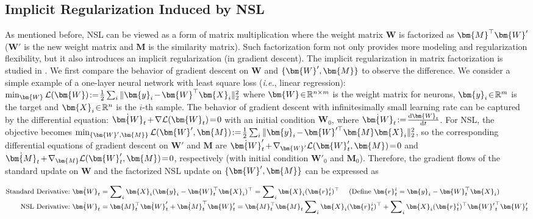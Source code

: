 \subsection{Implicit Regularization Induced by NSL}

As mentioned before, NSL can be viewed as a form of matrix multiplication where the weight matrix $\bm{W}$ is factorized as $\thickmuskip=2mu \medmuskip=2mu \bm{M}^\top\bm{W}'$ ($\bm{W}'$ is the new weight matrix and $\bm{M}$ is the similarity matrix). Such factorization form not only provides more modeling and regularization flexibility, but it also introduces an implicit regularization (in gradient descent). The implicit regularization in matrix factorization is studied in \cite{gunasekar2017implicit}. We first compare the behavior of gradient descent on $\bm{W}$ and $\thickmuskip=2mu \medmuskip=2mu \{\bm{W}', \bm{M}\}$ to observe the difference. We consider a simple example of a one-layer neural network with least square loss (\emph{i.e.}, linear regression): $\thickmuskip=2mu \medmuskip=2mu \min_{\bm{W}} \mathcal{L}(\bm{W}):= \frac{1}{2}\sum_i\|\bm{y}_i-\bm{W}^\top\bm{X}_i\|_2^2$ where $\thickmuskip=2mu \medmuskip=2mu \bm{W}\in\mathbb{R}^{n\times m}$ is the weight matrix for neurons, $\thickmuskip=2mu \medmuskip=2mu \bm{y}_i\in\mathbb{R}^m$ is the target and $\thickmuskip=2mu \medmuskip=2mu \bm{X}_i\in\mathbb{R}^{n}$ is the $i$-th sample. The behavior of gradient descent with infinitesimally small learning rate can be captured by the differential equation: $\thickmuskip=2mu \medmuskip=2mu \dot{\bm{W}}_t+\nabla \mathcal{L}(\bm{W}_t)=0$ with an initial condition $\bm{W}_0$, where $\thickmuskip=2mu \medmuskip=2mu \dot{\bm{W}}_t:=\frac{\textnormal{d}\bm{W}_t}{\textnormal{d}t}$. For NSL, the objective becomes $\thickmuskip=2mu \medmuskip=2mu \min_{\{\bm{W}',\bm{M}\}} \mathcal{L}(\bm{W}',\bm{M}):= \frac{1}{2}\sum_i\|\bm{y}_i-\bm{W}'^\top\bm{M}\bm{X}_i\|_2^2$, so the corresponding differential equations of gradient descent on $\bm{W}'$ and $\bm{M}$ are $\thickmuskip=2mu \medmuskip=2mu \dot{\bm{W}}'_t+\nabla_{\bm{W}'} \mathcal{L}(\bm{W}'_t,\bm{M})=0$ and $\thickmuskip=2mu \medmuskip=2mu \dot{\bm{M}}_t+\nabla_{\bm{M}} \mathcal{L}(\bm{W}'_t,\bm{M})=0$, respectively (with initial condition $\bm{W}'_0$ and $\bm{M}_0$). Therefore, the gradient flows of the standard update on $\bm{W}$ and the factorized NSL update on $\thickmuskip=2mu \medmuskip=2mu\{\bm{W}', \bm{M}\}$ can be expressed as

\begin{equation}
\footnotesize
\begin{aligned}
    \textnormal{Standard Derivative:}\  \dot{\bm{W}}_t&=\sum\nolimits_i\bm{X}_i(\bm{y}_i-\bm{W}_t^\top\bm{X}_i)^\top=\sum\nolimits_i\bm{X}_i(\bm{r}_t^i)^\top\ \ \ \ (\textnormal{Define}\ \thickmuskip=2mu \medmuskip=2mu \bm{r}_t^i=\bm{y}_i-\bm{W}_t^\top\bm{X}_i)\\[-0.9mm]
    \textnormal{NSL Derivative:}\ \dot{\bm{W}}_t &=\bm{M}_t^\top\dot{\bm{W}}'_t + \dot{\bm{M}}_t^\top\bm{W}'_t=\bm{M}_t^\top\bm{M}_t\sum\nolimits_i\bm{X}_i(\bm{r}_t^i)^\top+\sum\nolimits_i\bm{X}_i(\bm{r}^i_t)^\top{\bm{W}'}_t^\top\bm{W}'_t
\end{aligned}
\end{equation}

